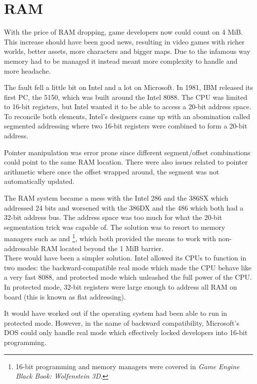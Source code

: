 \section{RAM}
With the price of RAM dropping, game developers now could count on 4 MiB. This increase should have been good news, resulting in video games with richer worlds, better assets, more characters and bigger maps. Due to the infamous way memory had to be managed it instead meant more complexity to handle and more headache.\\
\par
The fault fell a little bit on Intel and a lot on Microsoft. In 1981, IBM released its first PC, the 5150, which was built around the Intel 8088. The CPU was limited to 16-bit registers, but Intel wanted it to be able to access a 20-bit address space. To reconcile both elements, Intel's designers came up with an abomination called segmented addressing where two 16-bit registers were combined to form a 20-bit address.\\
\par

\vspace{-10pt}
\par
Pointer manipulation was error prone since different segment/offset combinations could point to the same RAM location. There were also issues related to pointer arithmetic where once the offset wrapped around, the segment was not automatically updated.\\
\par
The RAM system became a mess with the Intel 286 and the 386SX which addressed 24 bits and worsened with the 386DX and the 486 which both had a 32-bit address bus. The address space was too much for what the 20-bit segmentation trick was capable of. The solution was to resort to memory managers such as  and \footnote{16-bit programming and memory managers were covered in \textit{Game Engine Black Book: Wolfenstein 3D}.}, which both provided the means to work with non-addressable RAM located beyond the 1 MiB barrier.\\

There would have been a simpler solution. Intel allowed its CPUs to function in two modes: the backward-compatible real mode which made the CPU behave like a very fast 8088, and protected mode which unleashed the full power of the CPU. In protected mode, 32-bit registers were large enough to address all RAM on board (this is known as flat addressing).\\
\par
It would have worked out if the operating system had been able to run in protected mode. However, in the name of backward compatibility, Microsoft's DOS could only handle real mode which effectively locked developers into 16-bit programming.\\ 
\par




